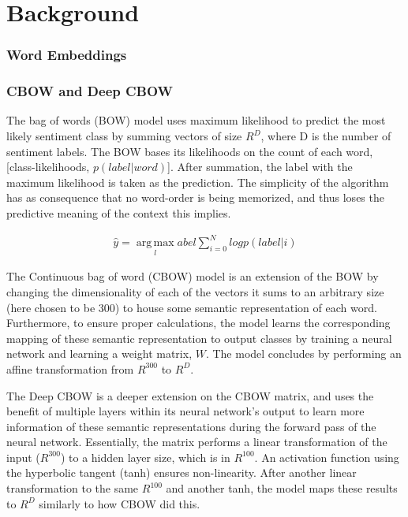 \section{Background}
\label{sec: background}
\subsubsection{Word Embeddings}
\subsubsection{CBOW and Deep CBOW}
The bag of words (BOW) model uses maximum likelihood to predict the most likely
sentiment class by summing vectors of size $R^{D}$, where D is the number of
sentiment labels. The BOW bases its likelihoods on the count of each word,
[class-likelihoods, $p(label|word)$]. After summation, the label with the
maximum likelihood is taken as the prediction. The simplicity of the algorithm
has as consequence that no word-order is being memorized, and thus loses the
predictive meaning of the context this implies.

\begin{align*}
    \hat{y} = \operatorname*{arg\,max}_label \sum^{N}_{i=0} log p(label|i)
\end{align*}

The Continuous bag of word (CBOW) model is an extension of the BOW by changing
the dimensionality of each of the vectors it sums to an arbitrary size (here
chosen to be 300) to house some semantic representation of each word.
Furthermore, to ensure proper calculations, the model learns the corresponding
mapping of these semantic representation to output classes by training a neural
network and learning a weight matrix, $W$. The model concludes by performing an
affine transformation from $R^300$ to $R^D$.

The Deep CBOW is a deeper extension on the CBOW matrix, and uses the benefit of
multiple layers within its neural network's output to learn more information of
these semantic representations during the forward pass of the neural network.
Essentially, the matrix performs a linear transformation of the input ($R^300$)
to a hidden layer size, which is in $R^100$. An activation function using the
hyperbolic tangent (tanh) ensures non-linearity. After another linear
transformation to the same $R^100$ and another tanh, the model maps these
results to $R^D$ similarly to how CBOW did this. 


